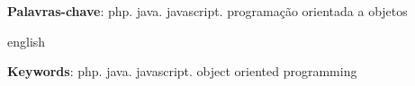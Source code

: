 

\renewcommand{\resumoname}{RESUMO}
\begin{resumoumacoluna}
	
	\lipsum[1]
	
	\noindent
	\textbf{Palavras-chave}: php. java. javascript. programação orientada a objetos
	
\end{resumoumacoluna}

\renewcommand{\resumoname}{ABSTRACT}
\begin{resumoumacoluna}
	\begin{otherlanguage*}{english}
		
		\lipsum[2]
		
		\noindent
		\textbf{Keywords}: php. java. javascript. object oriented programming
	\end{otherlanguage*}  
\end{resumoumacoluna}